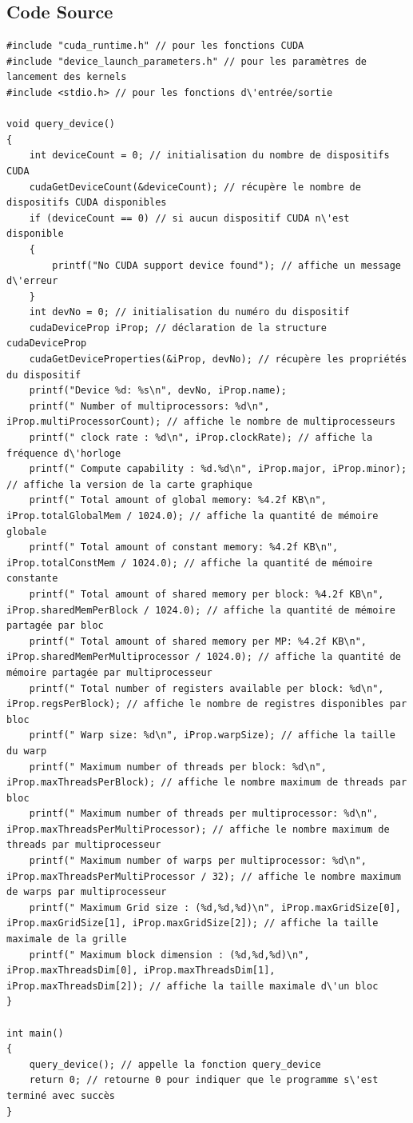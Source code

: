 \documentclass[a4paper,11pt]{article}
\begin{document}
\subsection{Code Source}
\begin{lstlisting}[caption=Code de l\'exercice 1 (exercice1.cu)]
#include "cuda_runtime.h" // pour les fonctions CUDA
#include "device_launch_parameters.h" // pour les paramètres de lancement des kernels
#include <stdio.h> // pour les fonctions d\'entrée/sortie

void query_device()
{
    int deviceCount = 0; // initialisation du nombre de dispositifs CUDA
    cudaGetDeviceCount(&deviceCount); // récupère le nombre de dispositifs CUDA disponibles
    if (deviceCount == 0) // si aucun dispositif CUDA n\'est disponible
    {
        printf("No CUDA support device found"); // affiche un message d\'erreur
    }
    int devNo = 0; // initialisation du numéro du dispositif
    cudaDeviceProp iProp; // déclaration de la structure cudaDeviceProp
    cudaGetDeviceProperties(&iProp, devNo); // récupère les propriétés du dispositif
    printf("Device %d: %s\n", devNo, iProp.name);
    printf(" Number of multiprocessors: %d\n", iProp.multiProcessorCount); // affiche le nombre de multiprocesseurs
    printf(" clock rate : %d\n", iProp.clockRate); // affiche la fréquence d\'horloge
    printf(" Compute capability : %d.%d\n", iProp.major, iProp.minor); // affiche la version de la carte graphique
    printf(" Total amount of global memory: %4.2f KB\n", iProp.totalGlobalMem / 1024.0); // affiche la quantité de mémoire globale
    printf(" Total amount of constant memory: %4.2f KB\n", iProp.totalConstMem / 1024.0); // affiche la quantité de mémoire constante
    printf(" Total amount of shared memory per block: %4.2f KB\n", iProp.sharedMemPerBlock / 1024.0); // affiche la quantité de mémoire partagée par bloc
    printf(" Total amount of shared memory per MP: %4.2f KB\n", iProp.sharedMemPerMultiprocessor / 1024.0); // affiche la quantité de mémoire partagée par multiprocesseur
    printf(" Total number of registers available per block: %d\n", iProp.regsPerBlock); // affiche le nombre de registres disponibles par bloc
    printf(" Warp size: %d\n", iProp.warpSize); // affiche la taille du warp
    printf(" Maximum number of threads per block: %d\n", iProp.maxThreadsPerBlock); // affiche le nombre maximum de threads par bloc
    printf(" Maximum number of threads per multiprocessor: %d\n", iProp.maxThreadsPerMultiProcessor); // affiche le nombre maximum de threads par multiprocesseur
    printf(" Maximum number of warps per multiprocessor: %d\n", iProp.maxThreadsPerMultiProcessor / 32); // affiche le nombre maximum de warps par multiprocesseur
    printf(" Maximum Grid size : (%d,%d,%d)\n", iProp.maxGridSize[0], iProp.maxGridSize[1], iProp.maxGridSize[2]); // affiche la taille maximale de la grille
    printf(" Maximum block dimension : (%d,%d,%d)\n", iProp.maxThreadsDim[0], iProp.maxThreadsDim[1], iProp.maxThreadsDim[2]); // affiche la taille maximale d\'un bloc
}

int main()
{
    query_device(); // appelle la fonction query_device
    return 0; // retourne 0 pour indiquer que le programme s\'est terminé avec succès
}
\end{lstlisting}
\end{document}
